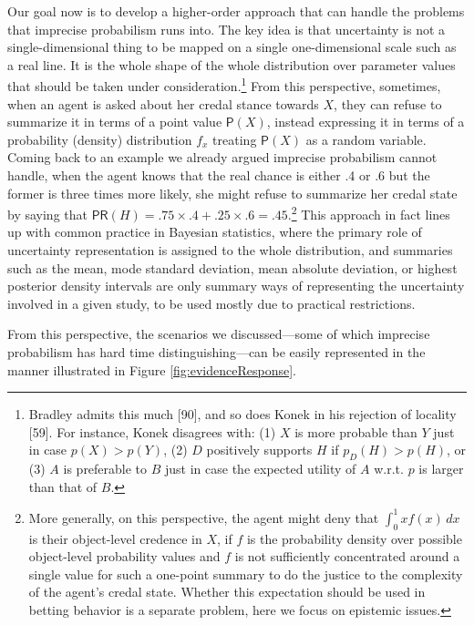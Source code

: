 \documentclass[
  10pt,
  dvipsnames,enabledeprecatedfontcommands]{scrartcl}
\begin{document}
Our goal now is to develop a higher-order approach that can handle the
problems that imprecise probabilism runs into. The key idea is that
uncertainty is not a single-dimensional thing to be mapped on a single
one-dimensional scale such as a real line. It is the whole shape of the
whole distribution over parameter values that should be taken under
consideration.\footnote{Bradley admits this much {[}90{]}, and
  so does Konek in his rejection of locality {[}59{]}. For instance,
  Konek disagrees with: (1) \(X\) is more probable than \(Y\) just in
  case \(p(X)>p(Y)\), (2) \(D\) positively supports \(H\) if
  \(p_D(H)> p(H)\), or (3) \(A\) is preferable to \(B\) just in case the
  expected utility of \(A\) w.r.t. \(p\) is larger than that of \(B\).}
From this perspective, sometimes, when an agent is asked about her
credal stance towards \(X\), they can refuse to summarize it in terms of
a point value \(\mathsf{P}(X)\), instead expressing it in terms of a
probability (density) distribution \(f_x\) treating \(\mathsf{P}(X)\) as
a random variable. Coming back to an example we already argued imprecise
probabilism cannot handle, when the agent knows that the real chance is
either .4 or .6 but the former is three times more likely, she might
refuse to summarize her credal state by saying that
\(\mathsf{PR}(H) = .75 \times .4 + .25 \times .6 = .45\).\footnote{More
  generally, on this perspective, the agent might deny that
  \(\int_{0}^{1} x f(x) \, dx\) is their object-level credence in \(X\),
  if \(f\) is the probability density over possible object-level
  probability values and \(f\) is not sufficiently concentrated around a
  single value for such a one-point summary to do the justice to the
  complexity of the agent's credal state. Whether this expectation
  should be used in betting behavior is a separate problem, here we
  focus on epistemic issues.} This approach in fact lines up with common
practice in Bayesian statistics, where the primary role of uncertainty
representation is assigned to the whole distribution, and summaries such
as the mean, mode standard deviation, mean absolute deviation, or
highest posterior density intervals are only summary ways of
representing the uncertainty involved in a given study, to be used
mostly due to practical restrictions.

From this perspective, the scenarios we discussed---some of which
imprecise probabilism has hard time distinguishing---can be easily
represented in the manner illustrated in Figure
\ref{fig:evidenceResponse}.
\end{document}
